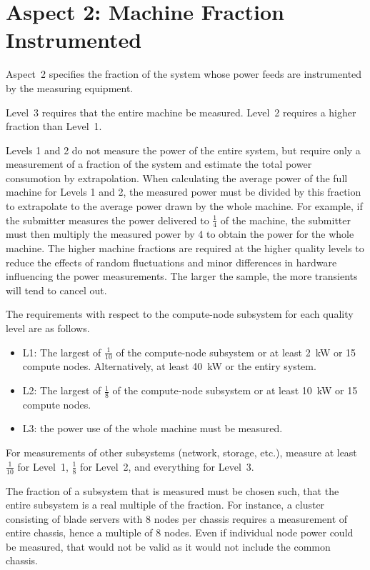 \section{Aspect 2: Machine Fraction Instrumented}
\label{sec:A2MFI}
\noindent
Aspect~2 specifies the fraction of the system whose power feeds are instrumented by the measuring equipment.
\wl

\noindent
Level~3 requires that the entire machine be measured.
Level~2 requires a higher fraction than Level~1.
\wl

\noindent
Levels 1 and 2 do not measure the power of the entire system, but require only a measurement of a fraction of the system and estimate the total power consumotion by extrapolation.
When calculating the average power of the full machine for Levels 1 and 2, the measured power must be divided by this fraction to 
extrapolate to the average power drawn by the whole machine.
For example, if the submitter measures the power delivered 
to $ \frac{1}{4} $ of the machine, the submitter must then multiply the measured power by 4 to obtain the power for the whole machine.
The higher machine fractions are required at the higher quality levels to reduce the effects of random fluctuations and minor differences in hardware influencing the power measurements.
The larger the sample, the more transients will tend to cancel out.
\wl

\noindent
The requirements with respect to the compute-node subsystem for each quality level are as follows.

\begin{itemize}
\item
L1: The largest of $\frac{1}{10}$ of the compute-node subsystem or at least 2~kW or 15 compute nodes.
Alternatively, at least 40~kW or the entiry system.
\item
L2: The largest of $\frac{1}{8}$ of the compute-node subsystem or at least 10~kW or 15 compute nodes.
\item
L3: the power use of the whole machine must be measured.
\end{itemize}

\noindent
For measurements of other subsystems (network, storage, etc.), measure at least $\frac{1}{10}$ for Level~1, $\frac{1}{8}$ for Level~2, and everything for Level~3.
\wl

\noindent
The fraction of a subsystem that is measured must be chosen such, that the entire subsystem is a real multiple of the fraction.
For instance, a cluster consisting of blade servers with 8 nodes per chassis requires a measurement of entire chassis, hence a multiple of 8 nodes.
Even if individual node power could be measured, that would not be valid as it would not include the common chassis.
\wl

